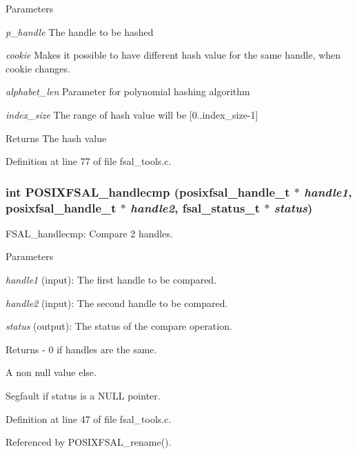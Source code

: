 \begin{DoxyParams}{Parameters}
\item[{\em p\_\-handle}]The handle to be hashed \item[{\em cookie}]Makes it possible to have different hash value for the same handle, when cookie changes. \item[{\em alphabet\_\-len}]Parameter for polynomial hashing algorithm \item[{\em index\_\-size}]The range of hash value will be [0..index\_\-size-\/1]\end{DoxyParams}
\begin{DoxyReturn}{Returns}
The hash value 
\end{DoxyReturn}


Definition at line 77 of file fsal\_\-tools.c.
\subsubsection[{POSIXFSAL\_\-handlecmp}]{\setlength{\rightskip}{0pt plus 5cm}int POSIXFSAL\_\-handlecmp (posixfsal\_\-handle\_\-t $\ast$ {\em handle1}, \/  posixfsal\_\-handle\_\-t $\ast$ {\em handle2}, \/  fsal\_\-status\_\-t $\ast$ {\em status})}\label{fsal__tools_8c_a53cbe2e91a4c6255f9c86ea2152642d3}
FSAL\_\-handlecmp: Compare 2 handles.


\begin{DoxyParams}{Parameters}
\item[{\em handle1}](input): The first handle to be compared. \item[{\em handle2}](input): The second handle to be compared. \item[{\em status}](output): The status of the compare operation.\end{DoxyParams}
\begin{DoxyReturn}{Returns}
-\/ 0 if handles are the same.
\begin{DoxyItemize}
\item A non null value else.
\item Segfault if status is a NULL pointer. 
\end{DoxyItemize}
\end{DoxyReturn}


Definition at line 47 of file fsal\_\-tools.c.

Referenced by POSIXFSAL\_\-rename().

